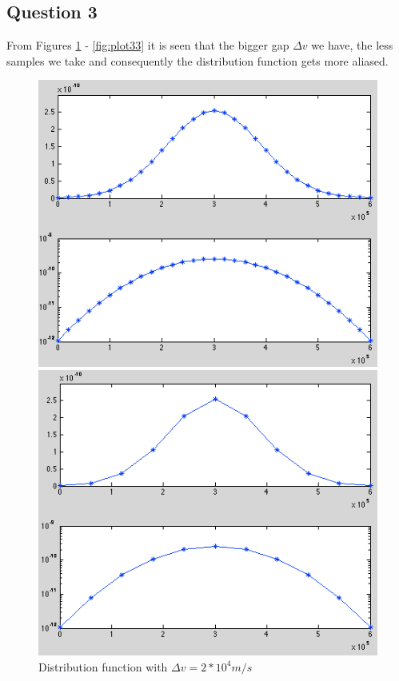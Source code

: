 \documentclass{article}
\begin{document}
\subsection{Question 3}

From Figures \ref{fig:plot31} - \ref{fig:plot33} it is seen that the bigger gap $\Delta v$ we have, the less samples we take and consequently the distribution function gets more aliased.

\begin{figure}[h!tb]
\begin{minipage}[b]{0.33\linewidth}
\centering
\includegraphics[width=\textwidth]{Figures/plot_31.png}
\caption{Distribution function with $\Delta v=2*10^4 m/s$}
\label{fig:plot31}
\end{minipage}
\begin{minipage}[b]{0.33\linewidth}
\centering
\includegraphics[width=\textwidth]{Figures/plot_32.png}

\end{minipage}
\end{figure}
\end{document}
